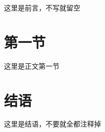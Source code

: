 \documentclass[a4paper,12pt]{article}
\begin{document}
\maketitle %

这里是前言，不写就留空

\section{第一节}
这里是正文第一节

\section*{结语}
这里是结语，不要就全都注释掉
\end{document}
